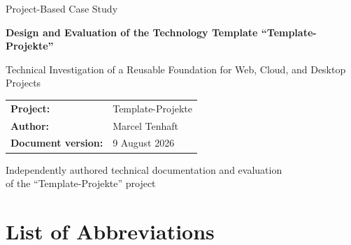 \documentclass[11pt,a4paper]{article}
\newcommand{\arbeitstitel}{Design and Evaluation of the
  Technology Template \enquote{Template-Projekte}}
\newcommand{\arbeituntertitel}{Technical Investigation of a
  Reusable Foundation for Web, Cloud, and Desktop Projects}
\newcommand{\arbeitart}{Project-Based Case Study}
\newcommand{\projektname}{Template-Projekte}
\newcommand{\autorname}{Marcel Tenhaft}
\newcommand{\dokumentstand}{9 August 2026}
\begin{document}
\hypersetup{pageanchor=false}
\thispagestyle{empty}

\begin{titlepage}
  \centering

  {\Large \arbeitart \par}
  \vspace{1.8cm}

  {\bfseries\LARGE \arbeitstitel \par}
  \vspace{0.6cm}

  {\large \arbeituntertitel \par}
  \vspace{2.5cm}

  \begin{tabularx}{0.82\textwidth}{@{}lX@{}}
    \textbf{Project:}          & \projektname \\
    \textbf{Author:}           & \autorname \\
    \textbf{Document version:} & \dokumentstand \\
  \end{tabularx}

  \vfill

  {\small
  Independently authored technical documentation and evaluation\\
  of the \enquote{\projektname} project
  \par}
\end{titlepage}

\hypersetup{pageanchor=true}
\setcounter{page}{1}

\clearpage
\tableofcontents

\clearpage
\renewcommand{\listfigurename}{List of Figures}
{}
\listoffigures

\clearpage
\renewcommand{\listtablename}{List of Tables}
{}
\listoftables

\clearpage
{}
\section*{List of Abbreviations}
\end{document}
